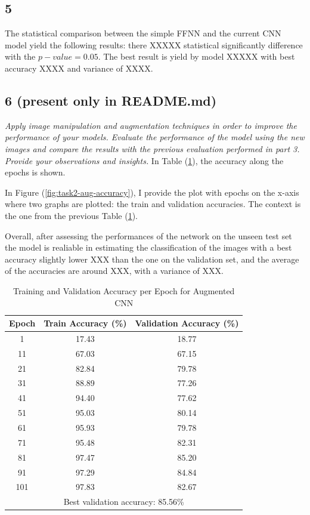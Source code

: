 \documentclass[11pt]{scrartcl}
\begin{document}
\subsection*{5}

The statistical comparison between the simple FFNN and the current CNN model yield 
the following results:
there XXXXX statistical significantly difference with the \( p-value = 0.05 \).
The best result is yield by model XXXXX with best accuracy XXXX and variance of XXXX.

\subsection*{6 (present only in README.md)}
\textit{
Apply image manipulation and augmentation techniques in order to improve the performance of your models. 
Evaluate the performance of the model using the new images 
and compare the results with the previous evaluation performed in part 3. 
Provide your observations and insights.
}
In Table (\ref{tab:task2-aug-accuracy}),
the accuracy along the epochs is shown.

In Figure (\ref{fig:task2-aug-accuracy}), 
I provide the plot with epochs on the x-axis where two graphs are plotted:
the train and validation accuracies.
The context is the one from the previous Table (\ref{tab:task2-aug-accuracy}). 

Overall, after assessing the performances of the network on the unseen test set
the model is realiable in estimating the classification of the images with
a best accuracy slightly lower XXX than the one on the validation set,
and the average of the accuracies are around XXX,
with a variance of XXX.

\begin{table}[htbp]
\centering
\caption{Training and Validation Accuracy per Epoch for Augmented CNN}
\begin{tabular}{ccc}
\toprule
\textbf{Epoch} & \textbf{Train Accuracy (\%)} & \textbf{Validation Accuracy (\%)} \\
\midrule
1    & 17.43  & 18.77  \\
11   & 67.03  & 67.15  \\
21   & 82.84  & 79.78  \\
31   & 88.89  & 77.26  \\
41   & 94.40  & 77.62  \\
51   & 95.03  & 80.14  \\
61   & 95.93  & 79.78  \\
71   & 95.48  & 82.31  \\
81   & 97.47  & 85.20  \\
91   & 97.29  & 84.84  \\
101  & 97.83  & 82.67  \\
\midrule
\multicolumn{3}{c}{Best validation accuracy: 85.56\%} \\
\bottomrule
\end{tabular}
\label{tab:task2-aug-accuracy}
\end{table}
\end{document}

